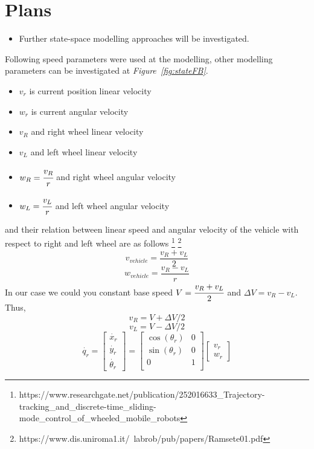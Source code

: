 \documentclass[a4paper,12pt]{article}
\begin{document}
\section{Plans}


\begin{itemize}

\item Further state-space modelling approaches will be investigated.


\end{itemize}
\newpage

\begin{appendices} 

Following speed parameters were used at the modelling, other modelling parameters can be investigated at \textit{Figure~\ref{fig:stateFB}}. 
\begin{itemize}
	\item $v_r$ is current position linear velocity 
	\item $w_r$ is current angular velocity 
	\item $v_R$ and right wheel linear velocity
	\item $v_L$ and left wheel linear velocity
	\item $w_R=\cfrac{v_R}{r}$ and right wheel angular velocity
	\item $w_L=\cfrac{v_L}{r}$ and left wheel angular velocity
\end{itemize}
and their relation between linear speed and angular velocity of the vehicle with respect to right and left wheel are as follows \footnote{ https://www.researchgate.net/publication/252016633\_Trajectory-tracking\_and\_discrete-time\_sliding-mode\_control\_of\_wheeled\_mobile\_robots}
 \footnote{https://www.dis.uniroma1.it/~labrob/pub/papers/Ramsete01.pdf}
$$ v_{vehicle}=\frac{v_R+v_L}{2} $$
$$ w_{vehicle}=\frac{v_R-v_L}{r} $$
In our case we could you constant base speed $V=\cfrac{v_R+v_L}{2}$ and $\Delta V=v_R-v_L$.
Thus, 
$$ v_R=V+\Delta V/2 $$
$$ v_L=V-\Delta V/2 $$ 
$$ \dot{q_r}=
	\begin{bmatrix} \dot{x_r} \\ \dot{y_r} \\ \dot{\theta_r}  \end{bmatrix}
 	=
  	\begin{bmatrix}
   	\cos (\theta_r) & 0 \\
   	\sin (\theta_r) & 0 \\
    0 & 1 \\
   	\end{bmatrix}
	\begin{bmatrix} v_r \\ w_r \end{bmatrix}
$$ 


\end{appendices}
\end{document}
